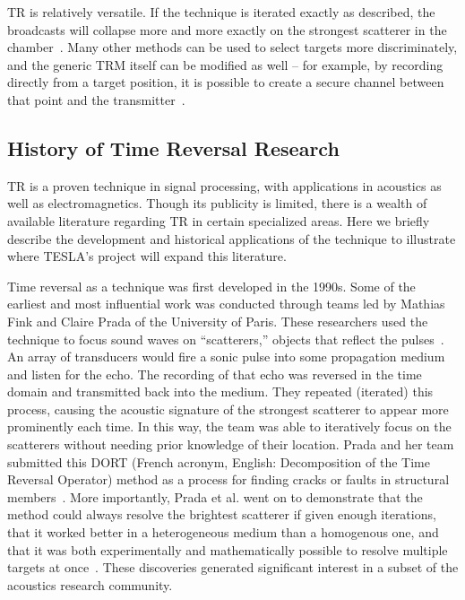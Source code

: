TR is relatively versatile. If the technique is iterated exactly as described, the broadcasts will collapse more and more exactly on the strongest scatterer in the chamber~\cite{fink_time-reversed_1999}. Many other methods can be used to select targets more discriminately, and the generic TRM itself can be modified as well -- for example, by recording directly from a target position, it is possible to create a secure channel between that point and the transmitter~\cite{nltr-wave-chaotic}.

\subsection{History of Time Reversal Research}

TR is a proven technique in signal processing, with applications in acoustics as well as electromagnetics. Though its publicity is limited, there is a wealth of available literature regarding TR in certain specialized areas. Here we briefly describe the development and historical applications of the technique to illustrate where TESLA's project will expand this literature.

Time reversal as a technique was first developed in the 1990s. Some of the earliest and most influential work was conducted through teams led by Mathias Fink and Claire Prada of the University of Paris. These researchers used the technique to focus sound waves on ``scatterers,'' objects that reflect the pulses~\cite{prada_iterative_1991}. An array of transducers would fire a sonic pulse into some propagation medium and listen for the echo. The recording of that echo was reversed in the time domain and transmitted back into the medium. They repeated (iterated) this process, causing the acoustic signature of the strongest scatterer to appear more prominently each time. In this way, the team was able to iteratively focus on the scatterers without needing prior knowledge of their location. Prada and her team submitted this DORT (French acronym, English: Decomposition of the Time Reversal Operator) method as a process for finding cracks or faults in structural members~\cite{prada_iterative_1991}. More importantly, Prada et al. went on to demonstrate that the method could always resolve the brightest scatterer if given enough iterations, that it worked better in a heterogeneous medium than a homogenous one, and that it was both experimentally and mathematically possible to resolve multiple targets at once~\cite{prada_decomposition_1996}. These discoveries generated significant interest in a subset of the acoustics research community.

